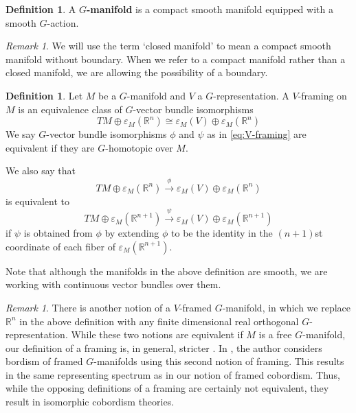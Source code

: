 \documentclass[11pt]{amsart}
\newcommand{\R}{\mathbb R}
\theoremstyle{plain}   %
\theoremstyle{definition}
\newtheorem{df}[thm]{Definition}
\theoremstyle{remark}
\newtheorem{rmk}[thm]{Remark}
\numberwithin{equation}{section}
\begin{document}
\begin{df}
A \textbf{$G$-manifold} is a compact smooth manifold equipped with a smooth $G$-action. 
\end{df}

\begin{rmk}
We will use the term `closed manifold' to mean a compact smooth manifold without boundary. When we refer to a compact manifold rather than a closed manifold, we are allowing the possibility of a boundary. 
\end{rmk}

\begin{df}\label{df:V-framing}
Let $M$ be a $G$-manifold and $V$ a $G$-representation. A $V$-framing on $M$ is an equivalence class of $G$-vector bundle isomorphisms
\begin{equation}\label{eq:V-framing}
TM\oplus \varepsilon_M(\R^n) \cong \varepsilon_M(V)\oplus\varepsilon_M(\R^n)
\end{equation}
We say $G$-vector bundle isomorphisms $\phi$ and $\psi$ as in \cref{eq:V-framing} are equivalent if they are $G$-homotopic over $M$. 

We also say that
\[
TM\oplus \varepsilon_M(\R^n) \xrightarrow{\phi} \varepsilon_M(V)\oplus\varepsilon_M(\R^n)
\]
is equivalent to 
\[
TM\oplus \varepsilon_M(\R^{n+1}) \xrightarrow{\psi} \varepsilon_M(V)\oplus\varepsilon_M(\R^{n+1})
\]
if $\psi$ is obtained from $\phi$ by extending $\phi$ to be the identity in the $(n+1)$st coordinate of each fiber of $\varepsilon_M(\R^{n+1})$. 
\end{df}

Note that although the manifolds in the above definition are smooth, we are working with continuous vector bundles over them.

\begin{rmk}
There is another notion of a $V$-framed $G$-manifold, in which we replace $\R^n$ in the above definition with any finite dimensional real orthogonal $G$-representation. While these two notions are equivalent if $M$ is a free $G$-manifold, our definition of a framing is, in general, stricter \cite{kosniowski_bordism}. In \cite{waner_1984_eq_bordism}, the author considers bordism of framed $G$-manifolds using this second notion of framing. This results in the same representing spectrum as in our notion of framed cobordism. Thus, while the opposing definitions of a framing are certainly not equivalent, they result in isomorphic cobordism theories. 
\end{rmk}
\end{document}
